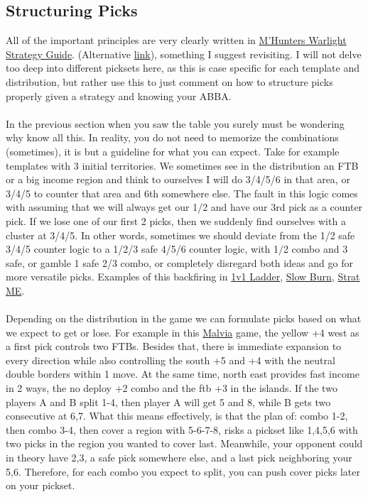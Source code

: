 \subsection{Structuring Picks}

All of the important principles are very clearly written in \href{http://nghood.com/pages/warzone/strategyguide}{M'Hunters Warlight Strategy Guide}. (Alternative \href{https://warlight.nghood.com/index.html}{link}), something I suggest revisiting. I will not delve too deep into different picksets here, as this is case specific for each template and distribution, but rather use this to just comment on how to structure picks properly given a strategy and knowing your ABBA.
\\
\\
In the previous section when you saw the table you surely must be wondering why know all this. In reality, you do not need to memorize the combinations (sometimes), it is but a guideline for what you can expect. Take for example templates with 3 initial territories. We sometimes see in the distribution an FTB or a big income region and think to ourselves I will do 3/4/5/6 in that area, or 3/4/5 to counter that area and 6th somewhere else. The fault in this logic comes with assuming that we will always get our 1/2 and have our 3rd pick as a counter pick. If we lose one of our first 2 picks, then we suddenly find ourselves with a cluster at 3/4/5. In other words, sometimes we should deviate from the 1/2 safe 3/4/5 counter logic to a 1/2/3 safe 4/5/6 counter logic, with 1/2 combo and 3 safe, or gamble 1 safe 2/3 combo, or completely disregard both ideas and go for more versatile picks. Examples of this backfiring in \href{https://www.warzone.com/MultiPlayer?GameID=39323183}{1v1 Ladder}, \href{https://www.warzone.com/MultiPlayer?GameID=40124025}{Slow Burn}, \href{https://www.warzone.com/MultiPlayer?GameID=15035176}{Strat ME}. 
\\
\\
Depending on the distribution in the game we can formulate picks based on what we expect to get or lose. For example in this \href{https://www.warzone.com/MultiPlayer?GameID=40132924}{Malvia} game, the yellow +4 west as a first pick controls two FTBs. Besides that, there is immediate expansion to every direction while also controlling the south +5 and +4 with the neutral double borders within 1 move. At the same time, north east provides fast income in 2 ways, the no deploy +2 combo and the ftb +3 in the islands. If the two players A and B split 1-4, then player A will get 5 and 8, while B gets two consecutive at 6,7. What this means effectively, is that the plan of: combo 1-2, then combo 3-4, then cover a region with 5-6-7-8, risks a pickset like 1,4,5,6 with two picks in the region you wanted to cover last. Meanwhile, your opponent could in theory have 2,3, a safe pick somewhere else, and a last pick neighboring your 5,6. Therefore, for each combo you expect to split, you can push cover picks later on your pickset.
